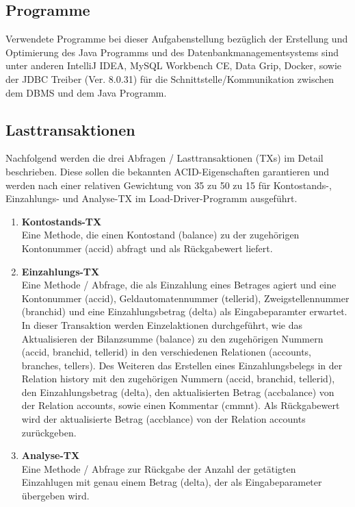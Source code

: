 \subsection{Programme}\label{subsec:programme}
Verwendete Programme bei dieser Aufgabenstellung bezüglich der Erstellung und Optimierung des Java Programms und des Datenbankmanagementsystems sind unter anderen IntelliJ IDEA, MySQL Workbench CE, Data Grip, Docker, sowie der JDBC Treiber (Ver. 8.0.31) für die Schnittstelle/Kommunikation zwischen dem DBMS und dem Java Programm.
\subsection{Lasttransaktionen}\label{subsec:lasttransaktionen}
Nachfolgend werden die drei Abfragen / Lasttransaktionen (TXs) im Detail beschrieben.
Diese sollen die bekannten ACID-Eigenschaften garantieren und werden nach einer relativen Gewichtung von 35 zu 50 zu 15 für Kontostands-, Einzahlungs- und Analyse-TX im Load-Driver-Programm ausgeführt.
\begin{enumerate}
    \item \textbf{Kontostands-TX} \\
    Eine Methode, die einen Kontostand (balance) zu der zugehörigen Kontonummer (accid) abfragt und als Rückgabewert liefert.
    \item \textbf{Einzahlungs-TX} \\
    Eine Methode / Abfrage, die als Einzahlung eines Betrages agiert und eine Kontonummer (accid), Geldautomatennummer (tellerid), Zweigstellennummer (branchid) und eine Einzahlungsbetrag (delta) als Eingabeparamter erwartet.
    In dieser Transaktion werden Einzelaktionen durchgeführt, wie das Aktualisieren der Bilanzsumme (balance) zu den zugehörigen Nummern (accid, branchid, tellerid) in den verschiedenen Relationen (accounts, branches, tellers).
    Des Weiteren das Erstellen eines Einzahlungsbelegs in der Relation history mit den zugehörigen Nummern (accid, branchid, tellerid), den Einzahlungsbetrag (delta), den aktualisierten Betrag (accbalance) von der Relation accounts, sowie einen Kommentar (cmmnt).
    Als Rückgabewert wird der aktualisierte Betrag (accblance) von der Relation accounts zurückgeben.
    \item \textbf{Analyse-TX} \\
    Eine Methode / Abfrage zur Rückgabe der Anzahl der getätigten Einzahlugen mit genau einem Betrag (delta), der als Eingabeparameter übergeben wird.
\end{enumerate}

